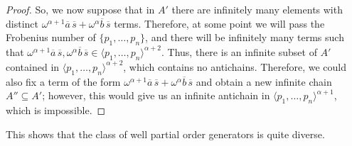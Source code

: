 \documentclass[reqno]{amsart}
\theoremstyle{definition}
\theoremstyle{definition}
\theoremstyle{plain} %
\begin{document}
\begin{proof}
    So, we now suppose that in $A'$ there are infinitely many elements with distinct $\omega^{\alpha+1}\overline{a}\,\overline{s} + \omega^{\alpha}\overline{b}\,\overline{s}$ terms. Therefore, at some point we will pass the Frobenius number of $\{p_1,\dots,p_n\}$, and there will be infinitely many terms such that $\omega^{\alpha+1}\overline{a}\,\overline{s}, \omega^{\alpha}\overline{b}\,\overline{s} \in \langle p_1,\dots,p_n \rangle^{\alpha+2}$. Thus, there is an infinite subset of $A'$ contained in $\langle p_1,\dots,p_n \rangle^{\alpha+2}$, which contains no antichains. Therefore, we could also fix a term of the form $\omega^{\alpha+1}\overline{a}\,\overline{s} + \omega^{\alpha}\overline{b}\,\overline{s}$ and obtain a new infinite chain $A''\subseteq A'$; however, this would give us an infinite antichain in $\langle p_1,\dots,p_n \rangle^{\alpha+1}$, which is impossible.
\end{proof}
This shows that the class of well partial order generators is quite diverse.
\end{document}

